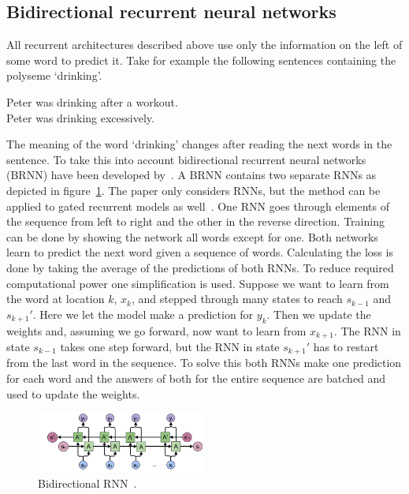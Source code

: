 \subsection{Bidirectional recurrent neural networks}
\label{subsec:bidirectional}
All recurrent architectures described above use only the information on the left of some word to predict it.
Take for example the following sentences containing the polyseme `drinking'.
\begin{center}
    Peter was drinking after a workout.\\[3mm]
    Peter was drinking excessively.
\end{center}
The meaning of the word `drinking' changes after reading the next words in the sentence.
To take this into account bidirectional recurrent neural networks (BRNN) have been developed by~\citet{schuster1997}.
A BRNN contains two separate RNNs as depicted in figure~\ref{fig:bidirectional}.
The paper only considers RNNs, but the method can be applied to gated recurrent models as well~\citep{peters2018}.
One RNN goes through elements of the sequence from left to right and the other in the reverse direction.
Training can be done by showing the network all words except for one.
Both networks learn to predict the next word given a sequence of words.
Calculating the loss is done by taking the average of the predictions of both RNNs.
To reduce required computational power one simplification is used.
Suppose we want to learn from the word at location $k$, $x_k$, and stepped through many states to reach $s_{k-1}$ and $s_{k+1}'$.
Here we let the model make a prediction for $y_k$.
Then we update the weights and, assuming we go forward, now want to learn from $x_{k+1}$.
The RNN in state $s_{k-1}$ takes one step forward, but the RNN in state $s_{k+1}'$ has to restart from the last word in the sequence.
To solve this both RNNs make one prediction for each word and the answers of both for the entire sequence are batched and used to update the weights.

\begin{figure}[htbp]
    \begin{center}
        \includegraphics[width=0.5\textwidth]{figures/bidirectional.png}
    \end{center}
    \caption{Bidirectional RNN~\citep{olah2015}.}
    \label{fig:bidirectional}
\end{figure}

